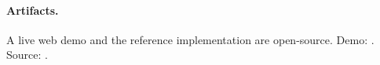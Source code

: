 \paragraph{Artifacts.}
A live web demo and the reference implementation are open-source.
Demo:
\href{https://soundcode-demo.psixyzt.com}%
     {}.
Source:
\href{https://github.com/leobwang/soundcode}%
     {}
\citep{soundcode2025github}.
